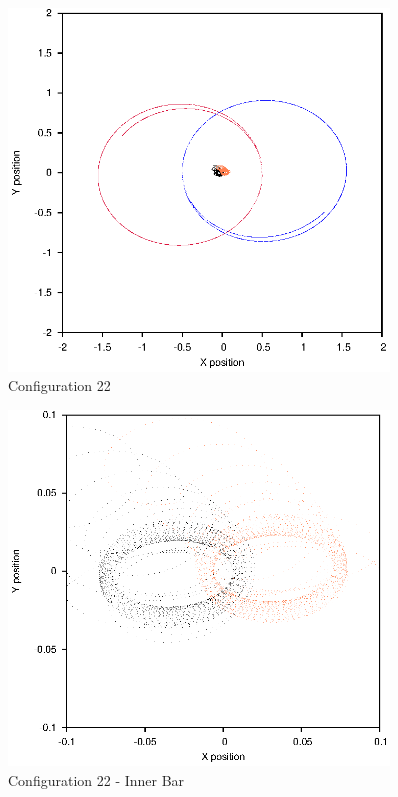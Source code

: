 \documentclass[a4paper,12pt]{article}
\begin{document}
\begin{figure}[H]
\centering
\includegraphics[width=0.9\textwidth]{./2017results/1-1-1-05/Orbit.eps}
\caption{Configuration 22}
\label{fig:config22}
\end{figure}
\begin{figure}[H]
\centering
\includegraphics[width=0.9\textwidth]{./2017results/1-1-1-05/Inner.eps}
\caption{Configuration 22 - Inner Bar}
\label{fig:config22i}
\end{figure}
\end{document}
